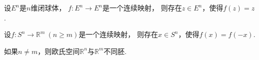 
\begin{theorem}
设\(E^n\)是\(n\)维闭球体，
\(f\colon E^n \to E^n\)是一个连续映射，
则存在\(z \in E^n\)，使得\(f(z) = z\).
\end{theorem}

\begin{theorem}
设\(f\colon S^n \to \mathbb{R}^m\ (n \geq m)\)是一个连续映射，
则存在\(x \in S^n\)，使得\(f(x) = f(-x)\).
\end{theorem}

\begin{theorem}
如果\(n \neq m\)，则欧氏空间\(\mathbb{R}^n\)与\(\mathbb{R}^m\)不同胚.
\end{theorem}
